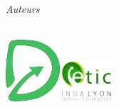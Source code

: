 \begin{center} \large
\emph{Auteurs} \\
\auteurs \\[2cm]
\end{center}




\vspace*{4cm}
\raggedright
\includegraphics[width=2cm]{figures/logo-doletic.png}\hfill\includegraphics[width=2cm]{figures/logo-etic.png}%

\vfill %

\tableofcontents

